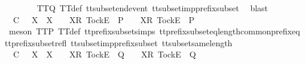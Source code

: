 \begin{isabellebody}
\ \ \ \ \ \ \isamarkupfalse%
\ TT{}{\isacharunderscore}Q\ TT{}{\isacharunderscore}def\ tt{\isacharunderscore}subset{\isacharunderscore}end{\isacharunderscore}event\ tt{\isacharunderscore}subset{\isacharunderscore}imp{\isacharunderscore}prefix{\isacharunderscore}subset\ \isamarkupfalse%
\ blast\isanewline
\ \ \isamarkupfalse%
\isanewline
\ \ \ \ \isamarkupfalse%
\ {\isachardoublequoteopen}{\isasymrho}{\isacharprime}\ {\isasymsubseteq}\isactrlsub C\ {\isasymrho}{\isacharprime}{\isacharprime}\ {\isasymLongrightarrow}\ X\ {\isasymsubseteq}\ X{\isacharprime}\ {\isasymLongrightarrow}\ {\isasymrho}{\isacharprime}{\isacharprime}\ {\isacharat}\ {\isacharbrackleft}{\isacharbrackleft}X{\isacharprime}{\isacharbrackright}\isactrlsub R{\isacharcomma}\ {\isacharbrackleft}Tock{\isacharbrackright}\isactrlsub E{\isacharbrackright}\ {\isasymin}\ P\ {\isasymLongrightarrow}\ {\isasymrho}{\isacharprime}\ {\isacharat}\ {\isacharbrackleft}{\isacharbrackleft}X{\isacharbrackright}\isactrlsub R{\isacharcomma}\ {\isacharbrackleft}Tock{\isacharbrackright}\isactrlsub E{\isacharbrackright}\ {\isasymin}\ P{\isachardoublequoteclose}\isanewline
\ \ \ \ \ \ \isamarkupfalse%
\ {\isacharparenleft}meson\ TT{}{\isacharunderscore}P\ TT{}{\isacharunderscore}def\ tt{\isacharunderscore}prefix{\isacharunderscore}subset{\isachardot}simps{\isacharparenleft}{}{\isacharparenright}\ tt{\isacharunderscore}prefix{\isacharunderscore}subset{\isacharunderscore}eq{\isacharunderscore}length{\isacharunderscore}common{\isacharunderscore}prefix{\isacharunderscore}eq\ tt{\isacharunderscore}prefix{\isacharunderscore}subset{\isacharunderscore}refl\ tt{\isacharunderscore}subset{\isacharunderscore}imp{\isacharunderscore}prefix{\isacharunderscore}subset\ tt{\isacharunderscore}subset{\isacharunderscore}same{\isacharunderscore}length{\isacharparenright}\isanewline
\ \ \isamarkupfalse%
\isanewline
\ \ \ \ \isamarkupfalse%
\ {\isachardoublequoteopen}{\isasymrho}{\isacharprime}\ {\isasymsubseteq}\isactrlsub C\ {\isasymrho}{\isacharprime}{\isacharprime}\ {\isasymLongrightarrow}\ X\ {\isasymsubseteq}\ X{\isacharprime}\ {\isasymLongrightarrow}\ {\isasymrho}{\isacharprime}{\isacharprime}\ {\isacharat}\ {\isacharbrackleft}{\isacharbrackleft}X{\isacharprime}{\isacharbrackright}\isactrlsub R{\isacharcomma}\ {\isacharbrackleft}Tock{\isacharbrackright}\isactrlsub E{\isacharbrackright}\ {\isasymin}\ Q\ {\isasymLongrightarrow}\ {\isasymrho}{\isacharprime}\ {\isacharat}\ {\isacharbrackleft}{\isacharbrackleft}X{\isacharbrackright}\isactrlsub R{\isacharcomma}\ {\isacharbrackleft}Tock{\isacharbrackright}\isactrlsub E{\isacharbrackright}\ {\isasymin}\ Q{\isachardoublequoteclose}\isanewline

\end{isabellebody}
